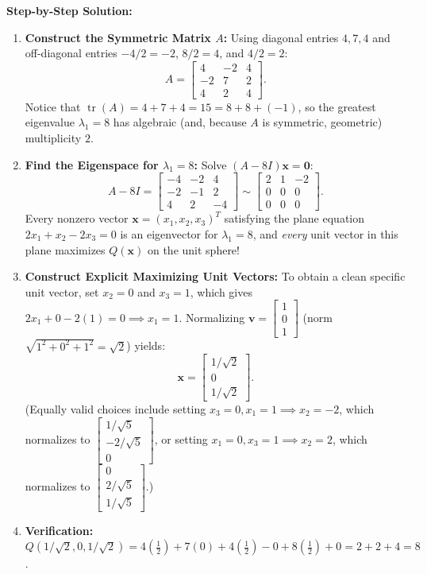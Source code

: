 \documentclass[11pt, letterpaper]{article}
\theoremstyle{definition}
\theoremstyle{remark}
\begin{document}
\textbf{Step-by-Step Solution:}
\begin{enumerate}[leftmargin=2em]
    \item \textbf{Construct the Symmetric Matrix $A$:}
    Using diagonal entries $4, 7, 4$ and off-diagonal entries $-4/2 = -2$, $8/2 = 4$, and $4/2 = 2$:
    \[
    A = \begin{bmatrix} 4 & -2 & 4 \\ -2 & 7 & 2 \\ 4 & 2 & 4 \end{bmatrix}.
    \]
    Notice that $\operatorname{tr}(A) = 4 + 7 + 4 = 15 = 8 + 8 + (-1)$, so the greatest eigenvalue $\lambda_1 = 8$ has algebraic (and, because $A$ is symmetric, geometric) multiplicity $2$.
    \item \textbf{Find the Eigenspace for $\lambda_1 = 8$:}
    Solve $(A - 8I)\mathbf{x} = \mathbf{0}$:
    \[
    A - 8I = \begin{bmatrix} -4 & -2 & 4 \\ -2 & -1 & 2 \\ 4 & 2 & -4 \end{bmatrix} \sim \begin{bmatrix} 2 & 1 & -2 \\ 0 & 0 & 0 \\ 0 & 0 & 0 \end{bmatrix}.
    \]
    Every nonzero vector $\mathbf{x} = (x_1, x_2, x_3)^T$ satisfying the plane equation $2x_1 + x_2 - 2x_3 = 0$ is an eigenvector for $\lambda_1 = 8$, and \emph{every} unit vector in this plane maximizes $Q(\mathbf{x})$ on the unit sphere!
    \item \textbf{Construct Explicit Maximizing Unit Vectors:}
    To obtain a clean specific unit vector, set $x_2 = 0$ and $x_3 = 1$, which gives $2x_1 + 0 - 2(1) = 0 \implies x_1 = 1$. Normalizing $\mathbf{v} = \begin{bmatrix} 1 \\ 0 \\ 1 \end{bmatrix}$ (norm $\sqrt{1^2 + 0^2 + 1^2} = \sqrt{2}$) yields:
    \[
    \mathbf{x} = \begin{bmatrix} 1/\sqrt{2} \\ 0 \\ 1/\sqrt{2} \end{bmatrix}.
    \]
    (Equally valid choices include setting $x_3 = 0, x_1 = 1 \implies x_2 = -2$, which normalizes to $\begin{bmatrix} 1/\sqrt{5} \\ -2/\sqrt{5} \\ 0 \end{bmatrix}$, or setting $x_1 = 0, x_3 = 1 \implies x_2 = 2$, which normalizes to $\begin{bmatrix} 0 \\ 2/\sqrt{5} \\ 1/\sqrt{5} \end{bmatrix}$.)
    \item \textbf{Verification:} $Q(1/\sqrt{2}, 0, 1/\sqrt{2}) = 4\left(\frac{1}{2}\right) + 7(0) + 4\left(\frac{1}{2}\right) - 0 + 8\left(\frac{1}{2}\right) + 0 = 2 + 2 + 4 = 8$.
\end{enumerate}
\end{document}
